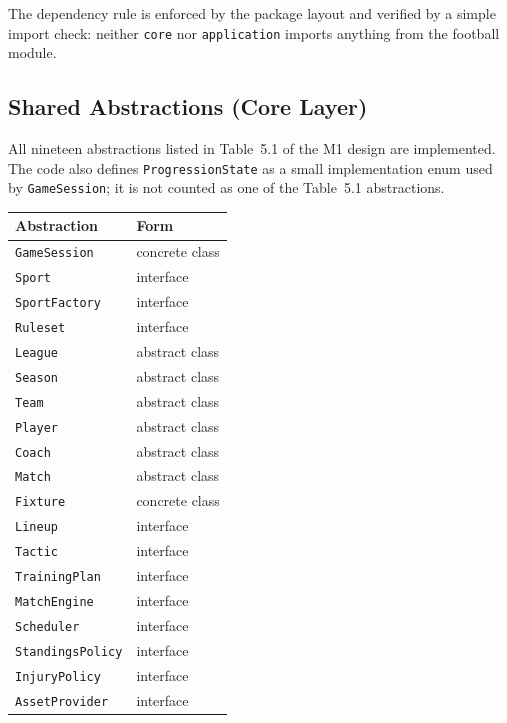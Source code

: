 \documentclass[11pt, a4paper]{article}
\newcommand{\code}[1]{\texttt{#1}}
\begin{document}
The dependency rule is enforced by the package layout and verified by a
simple import check: neither \code{core} nor \code{application} imports
anything from the football module.

\subsection{Shared Abstractions (Core Layer)}

All nineteen abstractions listed in Table~5.1 of the M1 design are
implemented. The code also defines \code{ProgressionState} as a small
implementation enum used by \code{GameSession}; it is not counted as one
of the Table~5.1 abstractions.

\begin{longtable}{ll}
    \toprule
    \textbf{Abstraction}      & \textbf{Form}                          \\
    \midrule
    \endhead
    \code{GameSession}        & concrete class                         \\
    \code{Sport}              & interface                              \\
    \code{SportFactory}       & interface                              \\
    \code{Ruleset}            & interface                              \\
    \code{League}             & abstract class                         \\
    \code{Season}             & abstract class                         \\
    \code{Team}               & abstract class                         \\
    \code{Player}             & abstract class                         \\
    \code{Coach}              & abstract class                         \\
    \code{Match}              & abstract class                         \\
    \code{Fixture}            & concrete class                         \\
    \code{Lineup}             & interface                              \\
    \code{Tactic}             & interface                              \\
    \code{TrainingPlan}       & interface                              \\
    \code{MatchEngine}        & interface                              \\
    \code{Scheduler}          & interface                              \\
    \code{StandingsPolicy}    & interface                              \\
    \code{InjuryPolicy}       & interface                              \\
    \code{AssetProvider}      & interface                              \\
    \bottomrule
\end{longtable}
\end{document}
